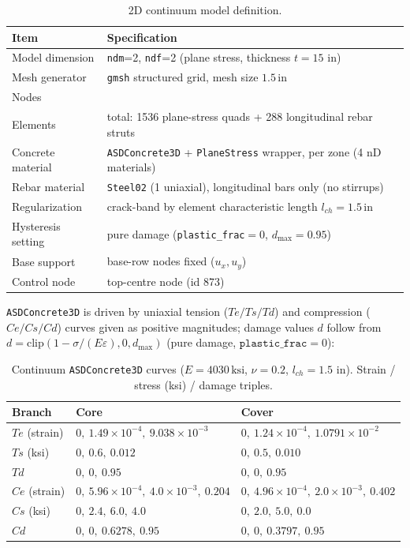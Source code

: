 \documentclass[11pt]{article}
\newcommand{\unit}[1]{\,\mathrm{#1}}
\newcommand{\code}[1]{\texttt{#1}}
\begin{document}
\begin{table}[H]
\centering
\caption{2D continuum model definition.}
\begin{tabular}{>{\raggedright\arraybackslash}p{4.4cm} >{\raggedright\arraybackslash}p{10.8cm}}
\toprule
Item & Specification \\
\midrule
Model dimension      & \code{ndm}=2, \code{ndf}=2 (plane stress, thickness $t=15$ in) \\
Mesh generator       & \code{gmsh} structured grid, mesh size $1.5\unit{in}$ \\
Nodes                & 1649 \\
Elements             & 1824 total: 1536 plane-stress quads + 288 longitudinal rebar struts \\
Concrete material    & \code{ASDConcrete3D} + \code{PlaneStress} wrapper, per zone (4 nD materials) \\
Rebar material       & \code{Steel02} (1 uniaxial), longitudinal bars only (no stirrups) \\
Regularization       & crack-band by element characteristic length $l_{ch}=1.5\unit{in}$ \\
Hysteresis setting   & pure damage (\code{plastic\_frac}$=0$, $d_{\max}=0.95$) \\
Base support         & 17 base-row nodes fixed ($u_x,u_y$) \\
Control node         & top-centre node (id 873) \\
\bottomrule
\end{tabular}
\end{table}

\code{ASDConcrete3D} is driven by uniaxial tension ($Te/Ts/Td$) and compression ($Ce/Cs/Cd$)
curves given as positive magnitudes; damage values $d$ follow from
$d=\mathrm{clip}(1-\sigma/(E\varepsilon),0,d_{\max})$ (pure damage, $\code{plastic\_frac}=0$):

\begin{table}[H]
\centering
\caption{Continuum \code{ASDConcrete3D} curves ($E=4030\unit{ksi}$, $\nu=0.2$, $l_{ch}=1.5$ in).
Strain / stress (ksi) / damage triples.}
\small
\begin{tabular}{l l l}
\toprule
Branch & Core & Cover \\
\midrule
$Te$ (strain) & $0,\ 1.49\!\times\!10^{-4},\ 9.038\!\times\!10^{-3}$ & $0,\ 1.24\!\times\!10^{-4},\ 1.0791\!\times\!10^{-2}$ \\
$Ts$ (ksi)    & $0,\ 0.6,\ 0.012$ & $0,\ 0.5,\ 0.010$ \\
$Td$          & $0,\ 0,\ 0.95$ & $0,\ 0,\ 0.95$ \\
$Ce$ (strain) & $0,\ 5.96\!\times\!10^{-4},\ 4.0\!\times\!10^{-3},\ 0.204$ & $0,\ 4.96\!\times\!10^{-4},\ 2.0\!\times\!10^{-3},\ 0.402$ \\
$Cs$ (ksi)    & $0,\ 2.4,\ 6.0,\ 4.0$ & $0,\ 2.0,\ 5.0,\ 0.0$ \\
$Cd$          & $0,\ 0,\ 0.6278,\ 0.95$ & $0,\ 0,\ 0.3797,\ 0.95$ \\
\bottomrule
\end{tabular}
\end{table}
\end{document}
